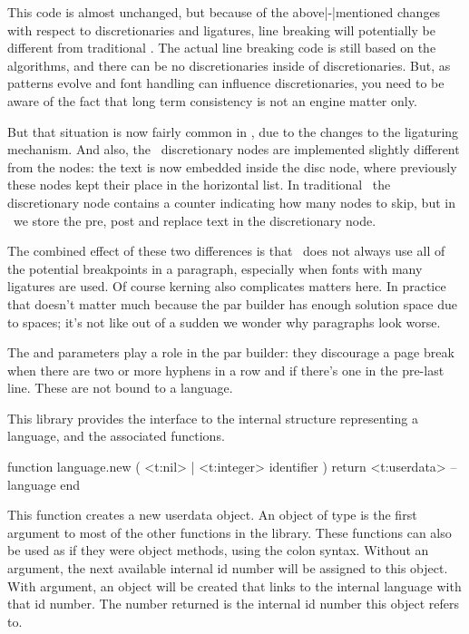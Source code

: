 \stopsection

\startsection[title={Breaking paragraphs into lines}]

This code is almost unchanged, but because of the above|-|mentioned changes with
respect to discretionaries and ligatures, line breaking will potentially be
different from traditional \TEX. The actual line breaking code is still based on
the  algorithms, and there can be no discretionaries inside of
discretionaries. But, as patterns evolve and font handling can influence
discretionaries, you need to be aware of the fact that long term consistency is
not an engine matter only.

But that situation is now fairly common in \LUATEX, due to the changes to the
ligaturing mechanism. And also, the \LUATEX\ discretionary nodes are implemented
slightly different from the  nodes: the  text is now
embedded inside the disc node, where previously these nodes kept their place in
the horizontal list. In traditional \TEX\ the discretionary node contains a
counter indicating how many nodes to skip, but in \LUATEX\ we store the pre, post
and replace text in the discretionary node.

The combined effect of these two differences is that \LUATEX\ does not always use
all of the potential breakpoints in a paragraph, especially when fonts with many
ligatures are used. Of course kerning also complicates matters here. In practice
that doesn't matter much because the par builder has enough solution space due to
spaces; it's not like out of a sudden we wonder why paragraphs look worse.

The \typ {\doublehyphendemerits} and \typ {\finalhyphendemerits} parameters play
a role in the par builder: they discourage a page break when there are two or
more hyphens in a row and if there's one in the pre-last line. These are not
bound to a language.

\stopsection


\startsection[title={The \type {language} library}][library=lang]

This library provides the interface to the internal structure representing a
language, and the associated functions.

\starttyping [option=LUA]
function language.new ( <t:nil> | <t:integer> identifier )
    return <t:userdata> -- language
end
\stoptyping

This function creates a new userdata object. An object of type 
is the first argument to most of the other functions in the 
library. These functions can also be used as if they were object methods, using
the colon syntax. Without an argument, the next available internal id number will
be assigned to this object. With argument, an object will be created that links
to the internal language with that id number. The number returned is the internal
\type {\language} id number this object refers to.

